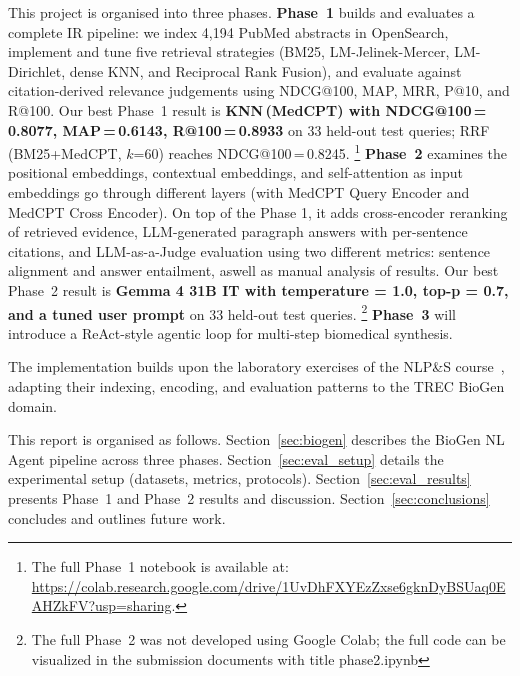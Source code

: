 This project is organised into three phases.
\textbf{Phase~1} builds and evaluates a complete
IR pipeline: we index 4{,}194 PubMed abstracts in OpenSearch, implement and
tune five retrieval strategies (BM25, LM-Jelinek-Mercer, LM-Dirichlet, dense
KNN, and Reciprocal Rank Fusion), and evaluate against citation-derived
relevance judgements using NDCG@100, MAP, MRR, P@10, and R@100.
Our best Phase~1 result is \textbf{KNN\,(MedCPT) with NDCG@100\,=\,0.8077,
MAP\,=\,0.6143, R@100\,=\,0.8933} on 33 held-out test queries;
RRF (BM25+MedCPT, $k$=60) reaches NDCG@100\,=\,0.8245.%
\footnote{The full Phase~1 notebook is available at:
\url{https://colab.research.google.com/drive/1UvDhFXYEzZxse6gknDyBSUaq0EAHZkFV?usp=sharing}.}
\textbf{Phase~2} examines the positional embeddings, contextual embeddings, and self-attention as input embeddings go through different layers (with MedCPT Query Encoder and MedCPT Cross Encoder). On top of the Phase 1, it adds cross-encoder reranking of retrieved evidence, LLM-generated paragraph answers with per-sentence citations, and LLM-as-a-Judge evaluation using two different metrics: sentence alignment and answer entailment, aswell as manual analysis of results.
Our best Phase~2 result is \textbf{Gemma 4 31B IT with temperature = 1.0, top-p = 0.7, and a tuned user prompt} on 33 held-out test queries.
\footnote{The full Phase~2 was not developed using Google Colab; the full code can be visualized in the submission documents with title phase2.ipynb}
\textbf{Phase~3} will introduce a ReAct-style agentic loop for multi-step
biomedical synthesis.

The implementation builds upon the laboratory exercises of the NLP\&S
course~\cite{opensearch}, adapting their indexing, encoding, and evaluation
patterns to the TREC BioGen domain.

\noindent
This report is organised as follows.
Section~\ref{sec:biogen} describes the BioGen NL Agent pipeline across three phases.
Section~\ref{sec:eval_setup} details the experimental setup (datasets, metrics, protocols).
Section~\ref{sec:eval_results} presents Phase~1 and Phase~2 results and discussion.
Section~\ref{sec:conclusions} concludes and outlines future work.
